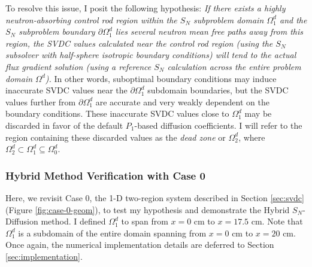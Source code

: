 To resolve this issue, I posit the following hypothesis: \textit{If there exists a highly
neutron-absorbing control rod region within the $S_N$ subproblem domain $\Omega^d_1$ and the $S_N$
subproblem boundary $\partial\Omega^d_1$ lies several neutron mean free paths away from this
region, the \gls{SVDC} values calculated near the control rod region (using the $S_N$ subsolver
with half-sphere isotropic boundary conditions) will tend to the actual flux gradient solution
(using a reference $S_N$ calculation across the entire problem domain $\Omega^d$).} In other words,
suboptimal boundary conditions may induce inaccurate \gls{SVDC} values near the $\partial
\Omega^d_1$ subdomain boundaries, but the \gls{SVDC} values further from $\partial\Omega^d_1$ are
accurate and very weakly dependent on the boundary conditions. These inaccurate \gls{SVDC} values
close to $\Omega^d_1$ may be discarded in favor of the default $P_1$-based diffusion coefficients.
I will refer to the region containing these discarded values as the \textit{dead zone} or
$\Omega^d_2$, where $\Omega^d_2 \subset \Omega^d_1 \subseteq \Omega^d_0$.

\subsubsection{Hybrid Method Verification with Case 0}

Here, we revisit Case 0, the 1-D two-region system described in Section \ref{sec:svdc} (Figure
\ref{fig:case-0-geom}), to test my hypothesis and demonstrate the Hybrid $S_N$-Diffusion method.
I defined $\Omega^d_1$ to span from $x=0$ cm to $x=17.5$ cm. Note that $\Omega^d_1$
is a subdomain of the entire domain spanning from $x=0$ cm to $x=20$ cm.
Once again, the numerical implementation details are deferred to Section \ref{sec:implementation}.

